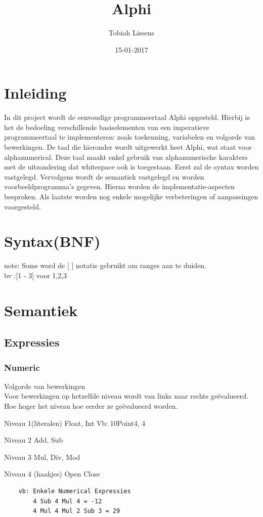 \documentclass[a4paper,10pt]{article}
\title{Alphi}
\author{Tobiah Lissens}
\date{15-01-2017}
\begin{document}
\maketitle
\newpage
\tableofcontents


\section{Inleiding}
In dit project wordt de eenvoudige programmeertaal Alphi opgesteld.
Hierbij is het de bedoeling verschillende basiselementen van een imperatieve programmeertaal te implementeren:
zoals toekenning, variabelen en volgorde van bewerkingen.
De taal die hieronder wordt uitgewerkt heet Alphi, wat staat voor alphanumerical.
Deze taal maakt enkel gebruik van alphanumerische karakters met de uitzondering dat whitespace ook is toegestaan.
Eerst zal de syntax worden vastgelegd.
Vervolgens wordt de semantiek vastgelegd en worden voorbeeldprogramma's gegeven.
Hierna worden de implementatie-aspecten besproken.
Als laatste worden nog enkele mogelijke verbeteringen of aanpassingen voorgesteld.

\newpage
\section{Syntax(BNF)}
    note: Soms word de [ ] notatie gebruikt om ranges aan te duiden.\\
    bv  :[1 - 3] voor 1,2,3
    
\section{Semantiek}
  \subsection{Expressies}
    \subsubsection{Numeric}
    Volgorde van bewerkingen\\
    Voor bewerkingen op hetzelfde niveau wordt van links naar rechts geëvalueerd.
    Hoe hoger het niveau hoe eerder ze geëvalueerd worden.

    Niveau 1(literalen)  
    Float, Int
    Vb: 10Point4, 4

    Niveau 2  
    Add, Sub

    Niveau 3  
    Mul, Div, Mod

    Niveau 4 (haakjes)  
    Open Close  
   \begin{lstlisting}
    vb: Enkele Numerical Expressies
        4 Sub 4 Mul 4 = -12      
        4 Mul 4 Mul 2 Sub 3 = 29
   \end{lstlisting}
\end{document}
